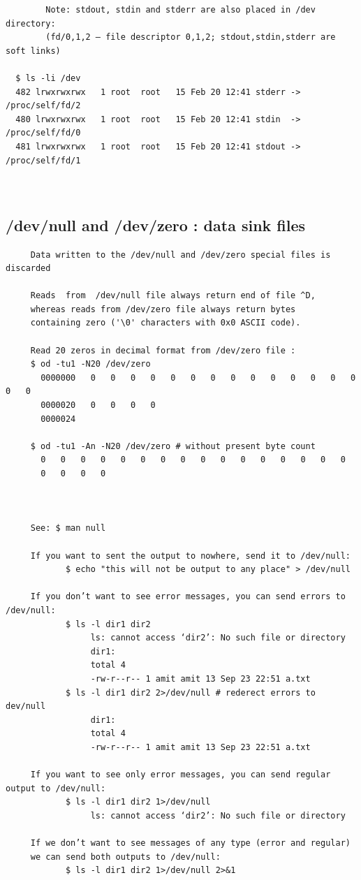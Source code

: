 \documentclass[a4paper,12pt]{article}
\begin{document}
\begin{verbatim}
        Note: stdout, stdin and stderr are also placed in /dev directory: 
        (fd/0,1,2 – file descriptor 0,1,2; stdout,stdin,stderr are soft links)
 ﻿
  $ ls -li /dev
  482 lrwxrwxrwx   1 root  root   15 Feb 20 12:41 stderr -> /proc/self/fd/2
  480 lrwxrwxrwx   1 root  root   15 Feb 20 12:41 stdin  -> /proc/self/fd/0
  481 lrwxrwxrwx   1 root  root   15 Feb 20 12:41 stdout -> /proc/self/fd/1
 
       
\end{verbatim}


\subsection{/dev/null and /dev/zero : data sink files}
\begin{verbatim}
     Data written to the /dev/null and /dev/zero special files is discarded
     
     Reads  from  /dev/null file always return end of file ^D, 
     whereas reads from /dev/zero file always return bytes 
     containing zero ('\0' characters with 0x0 ASCII code).     

     Read 20 zeros in decimal format from /dev/zero file : 
     $ od -tu1 -N20 /dev/zero
       0000000   0   0   0   0   0   0   0   0   0   0   0   0   0   0   0   0
       0000020   0   0   0   0
       0000024
     
     $ od -tu1 -An -N20 /dev/zero # without present byte count
       0   0   0   0   0   0   0   0   0   0   0   0   0   0   0   0
       0   0   0   0
 

 
     See: $ man null 
     
     If you want to sent the output to nowhere, send it to /dev/null: 
            $ echo "this will not be output to any place" > /dev/null
             
     If you don’t want to see error messages, you can send errors to /dev/null:
            $ ls -l dir1 dir2
                 ls: cannot access ‘dir2’: No such file or directory
                 dir1:
                 total 4
                 -rw-r--r-- 1 amit amit 13 Sep 23 22:51 a.txt
            $ ls -l dir1 dir2 2>/dev/null # rederect errors to dev/null
                 dir1:
                 total 4
                 -rw-r--r-- 1 amit amit 13 Sep 23 22:51 a.txt

     If you want to see only error messages, you can send regular output to /dev/null:
           ﻿ $ ls -l dir1 dir2 1>/dev/null
                 ls: cannot access ‘dir2’: No such file or directory

     If we don’t want to see messages of any type (error and regular) 
     we can send both outputs to /dev/null:
            $ ls -l dir1 dir2 1>/dev/null 2>&1
\end{verbatim}
\end{document}
